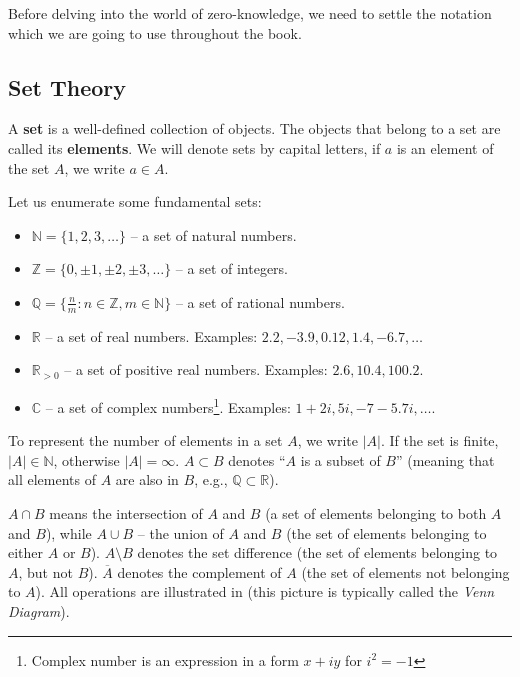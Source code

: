 \documentclass[../lecture-notes-148x210.tex]{subfiles}
\begin{document}
Before delving into the world of zero-knowledge, we need to settle the notation
which we are going to use throughout the book. 

\subsection*{Set Theory}

A \textbf{set} is a well-defined collection of objects. The objects that belong
to a set are called its \textbf{elements}. We will denote sets by capital
letters, if $a$ is an element of the set $A$, we write $a \in A$.

Let us enumerate some fundamental sets:

\begin{itemize}
    \item $\mathbb{N} = \{1, 2, 3, \dots\}$ -- a set of natural numbers.
    \item $\mathbb{Z} = \{0, \pm 1, \pm 2, \pm 3, \dots\}$ -- a set of integers.
    \item $\mathbb{Q} = \{\frac{n}{m}: n \in \mathbb{Z}, m \in \mathbb{N}\}$ -- a set of rational numbers.
    \item $\mathbb{R}$ -- a set of real numbers. Examples: $2.2, -3.9, 0.12, 1.4, -6.7, \dots$
    \item $\mathbb{R}_{>0}$ -- a set of positive real numbers. Examples: $2.6, 10.4, 100.2$.
    \item $\mathbb{C}$ -- a set of complex numbers\footnote{Complex number is an expression in a form $x+iy$ for $i^2=-1$}. 
    Examples: $1+2i, 5i, -7-5.7i, \dots$.
\end{itemize}

To represent the number of elements in a set $A$, we write $|A|$. If the set is finite, $|A| \in \mathbb{N}$, 
otherwise $|A| = \infty$. $A \subset B$ denotes ``$A$ is a subset of $B$'' (meaning that all elements of $A$ 
are also in $B$, e.g., $\mathbb{Q} \subset \mathbb{R}$).

$A \cap B$ means the intersection of $A$ and $B$ (a set of elements belonging to both $A$ and $B$), while 
$A \cup B$ -- the union of $A$ and $B$ (the set of elements belonging to either $A$ or $B$). $A \setminus B$ 
denotes the set difference (the set of elements belonging to $A$, but not $B$). $\overline{A}$ denotes the 
complement of $A$ (the set of elements not belonging to $A$). All operations are illustrated in 
 (this picture is typically called the \textit{Venn Diagram}).
\end{document}
